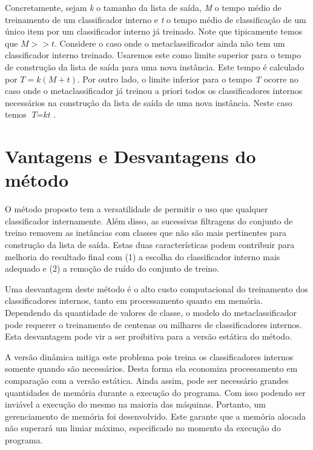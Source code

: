 Concretamente, sejam \textit{k} o tamanho da lista de saída, \textit{M} o tempo médio de treinamento de um classificador interno e \textit{t} o tempo médio de classificação de um único item por um classificador interno já treinado. Note que tipicamente temos que $ \textit{M} >> \textit{t} $. Considere o caso onde o metaclassificador ainda não tem um classificador interno treinado. Usaremos este como limite superior para o tempo de construção da lista de saída para uma nova instância. Este tempo é calculado por $ \textit{T} = \textit{k}\left(\textit{M} + \textit{t}\right) $. Por outro lado, o limite inferior para o tempo \textit{T} ocorre no caso onde o metaclassificador já treinou a priori todos os classificadores internos necessários na construção da lista de saída de uma nova instância. Neste caso temos $ \textit{T} = \textit{k}\textit{t} $.

\section{Vantagens e Desvantagens do método}

O método proposto tem a versatilidade de permitir o uso que qualquer classificador internamente. Além disso, as sucessivas filtragens do conjunto de treino removem as instâncias com classes que não são mais pertinentes para construção da lista de saída. Estas duas características podem contribuir para melhoria do resultado final com (1) a escolha do classificador interno mais adequado e (2) a remoção de ruído do conjunto de treino.

Uma desvantagem deste método é o alto custo computacional do treinamento dos classificadores internos, tanto em processamento quanto em memória. Dependendo da quantidade de valores de classe, o modelo do metaclassificador pode requerer o treinamento de centenas ou milhares de classificadores internos. Esta desvantagem pode vir a ser proibitiva para a versão estática do método. 

A versão dinâmica mitiga este problema pois treina os classificadores internos somente quando são necessários. Desta forma ela economiza processamento em comparação com a versão estática. Ainda assim, pode ser necessário grandes quantidades de memória durante a execução do programa. Com isso podendo ser inviável a execução do mesmo na maioria das máquinas. Portanto, um gerenciamento de memória foi desenvolvido. Este garante que a memória alocada não superará um limiar máximo, especificado no momento da execução do programa.

